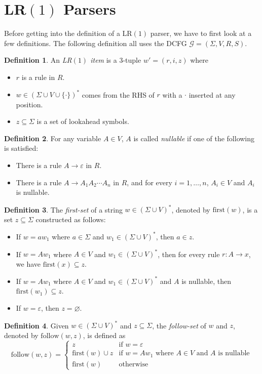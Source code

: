 \documentclass[titlepage]{article}
\theoremstyle{plain}
\theoremstyle{definition}
\newtheorem*{definition}{Definition}
\theoremstyle{remark}
\begin{document}
\section{LR$(1)$ Parsers}
Before getting into the definition of a LR$(1)$ parser, we have to first look
at a few definitions. The following definition all uses the DCFG $\mathcal{G}
=(\Sigma,V,R,S)$.
\begin{definition}
  An \textit{LR$(1)$ item} is a 3-tuple $w'=(r,i,z)$ where
  \begin{itemize}
    \item $r$ is a rule in $R$.
    \item $w\in{(\Sigma\cup V\cup\{\cdot\})}^*$ comes from the RHS of $r$
      with a $\cdot$ inserted at any position.
    \item $z\subseteq\Sigma$ is a set of lookahead symbols.
  \end{itemize}
\end{definition}
\begin{definition}
  For any variable $A\in V$, $A$ is called \textit{nullable} if one of the
  following is satisfied:
  \begin{itemize}
    \item There is a rule $A\rightarrow\varepsilon$ in $R$.
    \item There is a rule $A\rightarrow A_1A_2\cdots A_n$ in $R$, and for every
      $i=1,\ldots,n$, $A_i\in V$ and $A_i$ is nullable.
  \end{itemize}
\end{definition}
\begin{definition}
  The \textit{first-set} of a string $w\in{(\Sigma\cup V)}^*$, denoted by
  $\text{first}(w)$, is a set $z\subseteq\Sigma$ constructed as follows:
  \begin{itemize}
    \item If $w=aw_1$ where $a\in\Sigma$ and $w_1\in{(\Sigma\cup V)}^*$, then
      $a\in z$.
    \item If $w=Aw_1$ where $A\in V$ and $w_1\in{(\Sigma\cup V)}^*$, then
      for every rule $r: A\rightarrow x$, we have $\text{first}(x)\subseteq
      z$.
    \item If $w=Aw_1$ where $A\in V$ and $w_1\in{(\Sigma\cup V)}^*$ and $A$
        is nullable, then $\text{first}(w_1)\subseteq z$.
    \item If $w=\varepsilon$, then $z=\varnothing$.
  \end{itemize}
\end{definition}
\begin{definition}
  Given $w\in{(\Sigma\cup V)}^*$ and $z\subseteq\Sigma$, the
  \textit{follow-set} of $w$ and $z$, denoted by $\text{follow}(w,z)$, is
  defined as
  \[
    \text{follow}(w,z)=\begin{cases}
      z & \text{if }w=\varepsilon \\
      \text{first}(w)\cup z & \text{if }w=Aw_1\text{ where }A\in V\text{ and }
      A\text{ is nullable} \\
      \text{first}(w) & \text{otherwise}
    \end{cases}
  \]
\end{definition}
\end{document}
